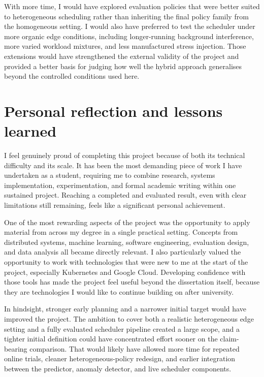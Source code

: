 \begin{appendices}
With more time, I would have explored evaluation policies that were better suited to heterogeneous scheduling rather than inheriting the final policy family from the homogeneous setting. I would also have preferred to test the scheduler under more organic edge conditions, including longer-running background interference, more varied workload mixtures, and less manufactured stress injection. Those extensions would have strengthened the external validity of the project and provided a better basis for judging how well the hybrid approach generalises beyond the controlled conditions used here.

\section{Personal reflection and lessons learned}

I feel genuinely proud of completing this project because of both its technical difficulty and its scale. It has been the most demanding piece of work I have undertaken as a student, requiring me to combine research, systems implementation, experimentation, and formal academic writing within one sustained project. Reaching a completed and evaluated result, even with clear limitations still remaining, feels like a significant personal achievement.

One of the most rewarding aspects of the project was the opportunity to apply material from across my degree in a single practical setting. Concepts from distributed systems, machine learning, software engineering, evaluation design, and data analysis all became directly relevant. I also particularly valued the opportunity to work with technologies that were new to me at the start of the project, especially Kubernetes and Google Cloud. Developing confidence with those tools has made the project feel useful beyond the dissertation itself, because they are technologies I would like to continue building on after university.

In hindsight, stronger early planning and a narrower initial target would have improved the project. The ambition to cover both a realistic heterogeneous edge setting and a fully evaluated scheduler pipeline created a large scope, and a tighter initial definition could have concentrated effort sooner on the claim-bearing comparison. That would likely have allowed more time for repeated online trials, cleaner heterogeneous-policy redesign, and earlier integration between the predictor, anomaly detector, and live scheduler components.


\end{appendices}
